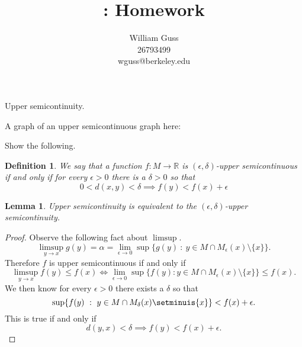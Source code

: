 \documentclass[letter]{article}
\title{\bCLASS: Homework \bHWN}
\author{William Guss\\26793499\\wguss@berkeley.edu}
\newtheorem{lemma}{Lemma}
\newtheorem{definition}{Definition}
\newenvironment{menumerate}{%
  \edef\backupindent{\the\parindent}%
  \enumerate%
  \setlength{\parindent}{\backupindent}%
}{\endenumerate}
\begin{document}
\maketitle
\thispagestyle{empty}

\begin{menumerate}
    \setcounter{enumi}{28}
    \item Upper semicontinuity.
    \begin{menumerate}
    \item A graph of an upper semicontinuous graph here:
    \\[3cm]
    \item Show the following.
    \begin{definition}
        We say that a function $f: M \to \mathbb{R}$ is
        $(\epsilon , \delta)$-upper semicontinuous if and only if
        for every $\epsilon > 0$ there is a $\delta > 0$ so that
        \begin{equation}
            0< d(x,y) < \delta \implies f(y) < f(x) + \epsilon
        \end{equation}
    \end{definition}
    \begin{lemma}
        Upper semicontinuity is equivalent to the $(\epsilon, \delta)$-upper semicontinuity.
    \end{lemma}
    \begin{proof}
        Observe the following fact about $\limsup.$ 
        \begin{equation}
            \limsup_{y\to x} g(y) = \alpha = \lim_{\epsilon \to 0} \sup \{g(y)\ :\ y \in M \cap M_{\epsilon}(x) \setminus \{x\}\}.
        \end{equation}
        Therefore $f$ is upper semicontinuous if and only if 
        \begin{equation}
            \limsup_{y\to x} f(y) \leq f(x) \iff \lim_{\epsilon \to 0}
            \sup\{f(y) : y \in M \cap M_{\epsilon}(x) \setminus \{x\} \} \leq f(x).       
        \end{equation}
        We then know for every $\epsilon >0$ there exists a $\delta $
        so that 
        \begin{equation}
            \sup \{f(y) \ :\ y \in M \cap M_\delta (x) \setminuis \{x\} \} < f(x) + \epsilon.
        \end{equation}
        This is true if and only if 
        \begin{equation}
            d(y,x) < \delta \implies f(y) < f(x) + \epsilon.       
        \end{equation}

\end{proof}
\end{menumerate}
\end{menumerate}
\end{document}
